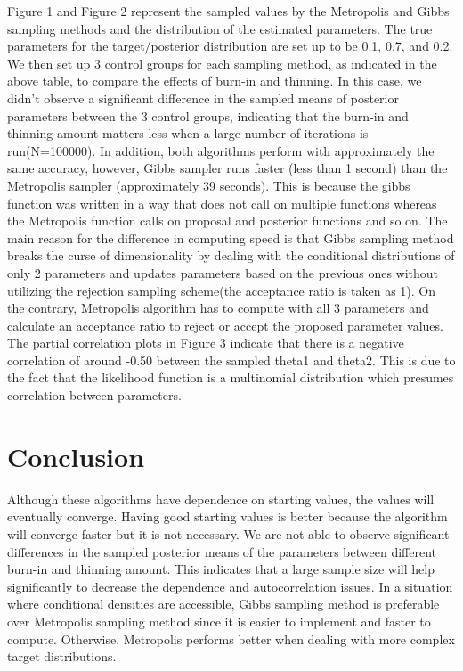 \documentclass[11pt,a4paper]{article}
\begin{document}
 Figure 1 and Figure 2 represent the sampled values by the Metropolis and Gibbs sampling methods and the distribution of the estimated parameters. The true parameters for the target/posterior distribution are set up to be 0.1, 0.7, and 0.2. We then set up 3 control groups for each sampling method, as indicated in the above table, to compare the effects of burn-in and thinning. In this case, we didn’t observe a significant difference in the sampled means of posterior parameters between the 3 control groups, indicating that the burn-in and thinning amount matters less when a large number of iterations is run(N=100000). In addition, both algorithms perform with approximately the same accuracy, however, Gibbs sampler runs faster (less than 1 second) than the Metropolis sampler (approximately 39 seconds). This is because the gibbs function was written in a way that does not call on multiple functions whereas the Metropolis function calls on proposal and posterior functions and so on. The main reason for the difference in computing speed is that Gibbs sampling method breaks the curse of dimensionality by dealing with the conditional distributions of only 2 parameters and updates parameters based on the previous ones without utilizing the rejection sampling scheme(the acceptance ratio is taken as 1). On the contrary, Metropolis algorithm has to compute with all 3 parameters and calculate an acceptance ratio to reject or accept the proposed parameter values. \\

The partial correlation plots in Figure 3 indicate that there is a negative correlation of around -0.50 between the sampled theta1 and theta2. This is due to the fact that the likelihood function is a multinomial distribution which presumes correlation between parameters. 



\section*{Conclusion}
Although these algorithms have dependence on starting values, the values will eventually converge. Having good starting values is better because the algorithm will converge faster but it is not necessary. We are not able to observe significant differences in the sampled posterior means of the parameters between different burn-in and thinning amount. This indicates that a large sample size will help significantly to decrease the dependence and autocorrelation issues. In a situation where conditional densities are accessible, Gibbs sampling method is preferable over Metropolis sampling method since it is easier to implement and faster to compute. Otherwise, Metropolis performs better when dealing with more complex target distributions. 
	
\end{document}
